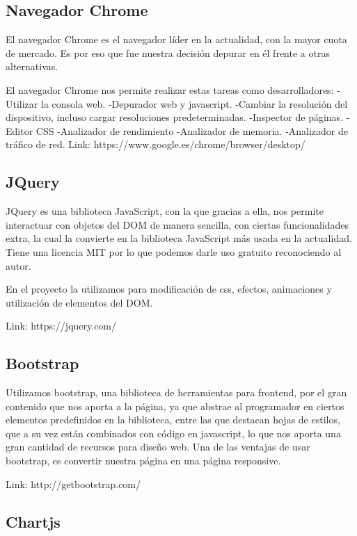 \subsection{Navegador Chrome}
El navegador Chrome es el navegador líder en la actualidad, con la mayor cuota de mercado. Es por eso que fue nuestra decisión depurar en él frente a otras alternativas.

El navegador Chrome nos permite realizar estas tareas como desarrolladores:
-Utilizar la consola web.
-Depurador web y javascript.
-Cambiar la resolución del dispositivo, incluso cargar resoluciones predeterminadas.
-Inspector de páginas.
-Editor CSS
-Analizador de rendimiento
-Analizador de memoria.
-Analizador de tráfico de red.
Link: https://www.google.es/chrome/browser/desktop/

\subsection{JQuery}
JQuery es una biblioteca JavaScript, con la que gracias a ella, nos permite interactuar con objetos del DOM de manera sencilla, con ciertas funcionalidades extra, la cual la convierte en la biblioteca JavaScript más usada en la actualidad. Tiene una licencia MIT por lo que podemos darle uso gratuito reconociendo al autor.

En el proyecto la utilizamos para modificación de css, efectos, animaciones y utilización de elementos del DOM.\cite{Jquery}

Link: https://jquery.com/

\subsection{Bootstrap}

Utilizamos bootstrap, una biblioteca de herramientas para frontend, por el gran contenido que nos aporta a la página, ya que abstrae al programador en ciertos elementos predefinidos en la biblioteca, entre las que destacan hojas de estilos, que a su vez están combinados con código en javascript, lo que nos aporta una gran cantidad de recursos para diseño web.
Una de las ventajas de usar bootstrap, es convertir nuestra página en una página responsive.

Link: http://getbootstrap.com/

\subsection{Chartjs}

